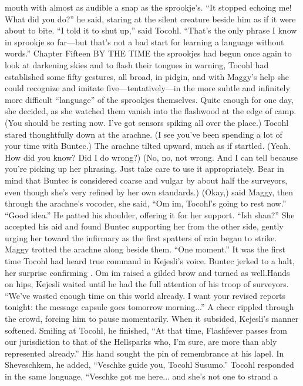 \documentclass[9pt]{article}
\begin{document}
mouth with almost as audible a snap as the sprookje’s. “It stopped echoing me! What did you do?” he
said, staring at the silent creature beside him as if it were about to bite.
“I told it to shut up,” said Tocohl. “That’s the only phrase I know in sprookje so far—but that’s not a
bad start for learning a language without words.”
Chapter Fifteen
BY THE TIME the sprookjes had begun once again to look at darkening skies and to flash their
tongues in warning, Tocohl had established some fifty gestures, all broad, in pidgin, and with Maggy’s
help she could recognize and imitate five—tentatively—in the more subtle and infinitely more difficult
“language” of the sprookjes themselves. Quite enough for one day, she decided, as she watched them
vanish into the flashwood at the edge of camp.
(You should be resting now. I’ve got sensors spiking all over the place.)
Tocohl stared thoughtfully down at the arachne. (I see you’ve been spending a lot of your time with
Buntec.)
The arachne tilted upward, much as if startled. (Yeah. How did you know? Did I do wrong?)
(No, no, not wrong. And I can tell because you’re picking up her phrasing. Just take care to use it
appropriately. Bear in mind that Buntec is considered coarse and vulgar by about half the surveyors, even
though she’s very refined by her own standards.)
(Okay,) said Maggy, then through the arachne’s vocoder, she said, “Om im, Tocohl’s going to rest
now.”
“Good idea.” He patted his shoulder, offering it for her support. “Ish shan?” She accepted his aid and
found Buntec supporting her from the other side, gently urging her toward the infirmary as the first
spatters of rain began to strike. Maggy trotted the arachne along beside them.
“One moment.”
It was the first time Tocohl had heard true command in Kejesli’s voice. Buntec jerked to a halt, her
surprise confirming . Om im raised a gilded brow and turned as well.Hands on hips, Kejesli waited until he had the full attention of his troop of surveyors. “We’ve wasted
enough time on this world already. I want your revised reports tonight: the message capsule goes
tomorrow morning...” A cheer rippled through the crowd, forcing him to pause momentarily. When it
subsided, Kejesli’s manner softened. Smiling at Tocohl, he finished, “At that time, Flashfever passes from
our jurisdiction to that of the Hellsparks who, I’m sure, are more than ably represented already.”
His hand sought the pin of remembrance at his lapel. In Sheveschkem, he added, “Veschke guide
you, Tocohl Susumo.”
Tocohl responded in the same language, “Veschke got me here... and she’s not one to strand a
\end{document}
